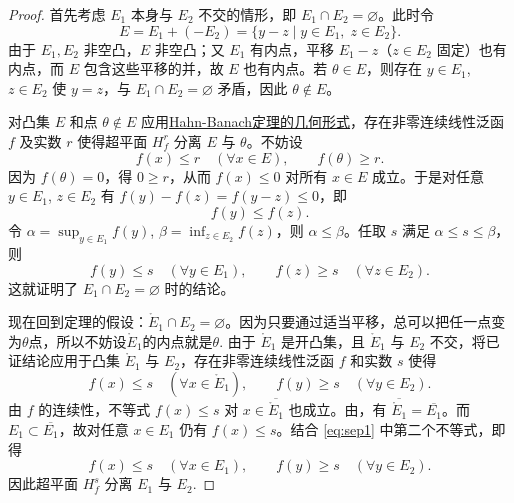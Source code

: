 \documentclass[../../main.tex]{subfiles}%
\begin{document}
\begin{proof}
首先考虑 $E_1$ 本身与 $E_2$ 不交的情形，即 $E_1 \cap E_2 = \varnothing$。此时令
\[
E = E_1 + (-E_2) = \{y - z \mid y \in E_1,\; z \in E_2\}.
\]
由于 $E_1, E_2$ 非空凸，$E$ 非空凸；又 $E_1$ 有内点，平移 $E_1 - z$（$z \in E_2$ 固定）也有内点，而 $E$ 包含这些平移的并，故 $E$ 也有内点。若 $\theta \in E$，则存在 $y\in E_1$, $z\in E_2$ 使 $y=z$，与 $E_1\cap E_2=\varnothing$ 矛盾，因此 $\theta \notin E$。

对凸集 $E$ 和点 $\theta\notin E$ 应用\hyperref[theorem:Hahn-Banach定理的几何形式]{Hahn-Banach定理的几何形式}，存在非零连续线性泛函 $f$ 及实数 $r$ 使得超平面 $H_f^r$ 分离 $E$ 与 $\theta$。不妨设
\[
f(x) \leqslant r \quad (\forall x \in E),\qquad f(\theta) \geqslant r.
\]
因为 $f(\theta)=0$，得 $0 \geqslant r$，从而 $f(x) \leqslant 0$ 对所有 $x\in E$ 成立。于是对任意 $y\in E_1$, $z\in E_2$ 有 $f(y)-f(z)=f(y-z)\leqslant 0$，即
\[
f(y) \leqslant f(z).
\]
令 $\alpha = \sup_{y\in E_1} f(y)$, $\beta = \inf_{z\in E_2} f(z)$，则 $\alpha \leqslant \beta$。任取 $s$ 满足 $\alpha \leqslant s \leqslant \beta$，则
\[
f(y) \leqslant s \quad (\forall y\in E_1), \qquad f(z) \geqslant s \quad (\forall z\in E_2).
\]
这就证明了 $E_1\cap E_2=\varnothing$ 时的结论。

现在回到定理的假设：$\mathring{E}_1 \cap E_2 = \varnothing$。因为只要通过适当平移，总可以把任一点变为$\theta$点，所以不妨设$\mathring{E}_1$的内点就是$\theta$.
由于 $\mathring{E}_1$ 是开凸集，且 $\mathring{E}_1$ 与 $E_2$ 不交，将已证结论应用于凸集 $\mathring{E}_1$ 与 $E_2$，存在非零连续线性泛函 $f$ 和实数 $s$ 使得
\begin{equation}\label{eq:sep1}
f(x) \leqslant s \quad (\forall x \in \mathring{E}_1), \qquad 
f(y) \geqslant s \quad (\forall y \in E_2).
\end{equation}
由 $f$ 的连续性，不等式 $f(x) \leqslant s$ 对 $x\in \overline{\mathring{E}_1}$ 也成立。由，有 $\overline{\mathring{E}_1} = \overline{E_1}$。而 $E_1 \subset \overline{E_1}$，故对任意 $x\in E_1$ 仍有 $f(x) \leqslant s$。结合 \eqref{eq:sep1} 中第二个不等式，即得
\[
f(x) \leqslant s \quad (\forall x \in E_1), \qquad 
f(y) \geqslant s \quad (\forall y \in E_2).
\]
因此超平面 $H_f^s$ 分离 $E_1$ 与 $E_2$.
\end{proof}
\end{document}
